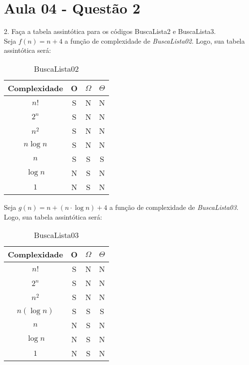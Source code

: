 \section{Aula 04 - Questão 2}
2. Faça a tabela assintótica para os códigos BuscaLista2 e BuscaLista3. \\

Seja $f(n) = n + 4$ a função de complexidade de \textit{BuscaLista02}. Logo, sua tabela assintótica será:
\begin{table}[ht!]
    \centering
    \begin{tabular}{|c|c|c|c|}
    \hline
    \textbf{Complexidade} & \textbf{O} & $\Omega$ & $\Theta$ \\ \hline
    $n!$ & S & N & N \\ \hline
    $2^n$ & S & N & N \\ \hline
    $n^2$ & S & N & N \\ \hline
    $n\log n$ & S & N & N \\ \hline
    $n$ & S & S & S \\ \hline
    $\log n$ & N & S & N \\ \hline
    $1$ & N & S & N \\ \hline 
    \end{tabular}
    \caption{BuscaLista02}
\end{table}

Seja $g(n) = n + (n \cdot \log n) + 4$ a função de complexidade de \textit{BuscaLista03}. Logo, sua tabela assintótica será:
\begin{table}[ht!]
    \centering
    \begin{tabular}{|c|c|c|c|}
    \hline
    \textbf{Complexidade} & \textbf{O} & $\Omega$ & $\Theta$ \\ \hline
    $n!$ & S & N & N \\ \hline
    $2^n$ & S & N & N \\ \hline
    $n^2$ & S & N & N \\ \hline
    $n(\log n)$ & S & S & S \\ \hline
    $n$ & N & S & N \\ \hline
    $\log n$ & N & S & N \\ \hline
    $1$ & N & S & N \\ \hline 
    \end{tabular}
    \caption{BuscaLista03}
\end{table}
